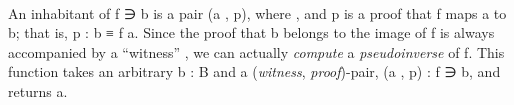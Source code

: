 \begin{code}
\>[1]\AgdaSpace{}%
\AgdaSymbol{:}\AgdaSpace{}%
\AgdaSymbol{(}\AgdaSpace{}%
\AgdaSymbol{:}\AgdaSpace{}%
\AgdaSpace{}%
\AgdaSpace{}%
\AgdaSymbol{)(}\AgdaSpace{}%
\AgdaSymbol{:}\AgdaSpace{}%
\AgdaSymbol{)(}\AgdaSpace{}%
\AgdaSymbol{:}\AgdaSpace{}%
\AgdaSymbol{)}\AgdaSpace{}%
\AgdaSpace{}%
\AgdaSpace{}%
\AgdaSpace{}%
\AgdaSpace{}%
\AgdaSpace{}%
\AgdaSpace{}%
\AgdaSpace{}%
\AgdaSpace{}%
\AgdaSpace{}%
\<%
\\
%
\>[1]\AgdaSpace{}%
\AgdaSpace{}%
\AgdaSpace{}%
\AgdaSpace{}%
\AgdaSpace{}%
\AgdaSymbol{=}\AgdaSpace{}%
\AgdaSpace{}%
\AgdaSpace{}%
\AgdaSpace{}%
\<%
\end{code}
\ccpad
An inhabitant of  \ab f \af ∋ \ab b is a pair (\ab a , \ab p), where , and \ab p is a proof that \ab f maps \ab a to \ab b; that is, \ab p \as : \ab b \ad ≡ \ab f \ab a. Since the proof that \ab b belongs to the image of \ab f is always accompanied by a ``witness'' , we can actually \emph{compute} a \emph{pseudoinverse} of \ab f. This function takes an arbitrary \ab b \as : \ab B and a (\textit{witness}, \textit{proof})-pair, (\ab a , \ab p) \as :  \ab f \af ∋ \ab b, and returns \ab a.
\ccpad
\begin{code}%
\>[1]\AgdaSpace{}%
\AgdaSymbol{:}\AgdaSpace{}%
\AgdaSymbol{(}\AgdaSpace{}%
\AgdaSymbol{:}\AgdaSpace{}%
\AgdaSpace{}%
\AgdaSpace{}%
\AgdaSymbol{)\{}\AgdaSpace{}%
\AgdaSymbol{:}\AgdaSpace{}%
\AgdaSymbol{\}}\AgdaSpace{}%
\AgdaSpace{}%
\AgdaSpace{}%
\AgdaSpace{}%
\AgdaSpace{}%
%
\>[41]%
\>[44]\<%
\\
%
\>[1]\AgdaSpace{}%
\AgdaSpace{}%
\AgdaSymbol{\{}\AgdaSpace{}%
\AgdaDottedPattern{\AgdaSymbol{)}}\AgdaSymbol{\}}\AgdaSpace{}%
\AgdaSymbol{(}\AgdaSpace{}%
\AgdaSymbol{)}\AgdaSpace{}%
\AgdaSymbol{=}\AgdaSpace{}%
\<%
\\
%
\>[1]\AgdaSpace{}%
\AgdaSpace{}%
\AgdaSymbol{(}\AgdaSpace{}%
\AgdaSymbol{\AgdaUnderscore{}}\AgdaSpace{}%
\AgdaSpace{}%
\AgdaSymbol{\AgdaUnderscore{})}\AgdaSpace{}%
\AgdaSymbol{=}\AgdaSpace{}%
\<%
\end{code}
